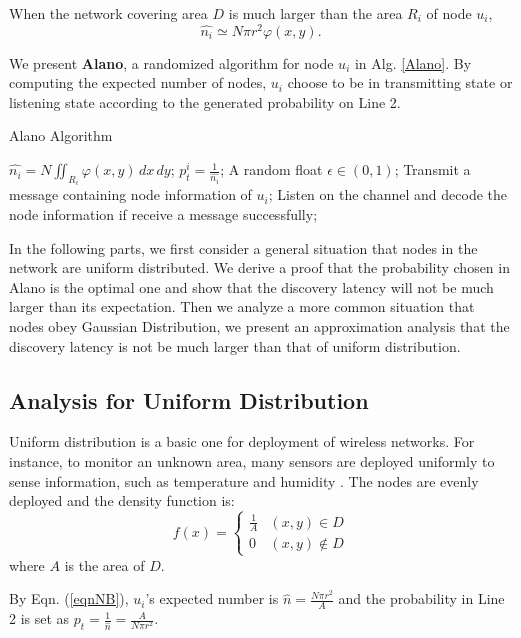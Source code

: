 When the network covering area $D$ is much larger than the area $R_i$ of node $u_i$, 
\begin{equation}
\label{eqnNB}
\hat{n_i} \simeq N\pi r^2 \varphi(x,y).
\end{equation}


We present \textbf{Alano}, a randomized algorithm for node $u_i$ in Alg. \ref{Alano}.
By computing the expected number of nodes, $u_i$ choose to be in transmitting state or listening state according to the generated probability on Line 2.


\begin{algorithm}
\caption{Alano Algorithm}
\label{Alano}
\begin{algorithmic}[1]
\STATE $\hat{n_i} = N\iint_{R_i} \varphi(x,y)\,dx\,dy$;
\STATE $p_t^i = \frac{1}{\hat{n_i}}$;
	\STATE A random float $\epsilon \in (0,1)$;
    		\STATE Transmit a message containing node information of $u_i$;
	\ELSE
    		\STATE Listen on the channel and decode the node information if receive a message successfully;
	\ENDIF
\ENDWHILE
\end{algorithmic}
\end{algorithm}

In the following parts, we first consider a general situation that nodes in the network are uniform distributed. We derive a proof that the probability chosen in Alano is the optimal one and show that the discovery latency will not be much larger than its expectation. Then we analyze a more common situation that nodes obey Gaussian Distribution, we present an
approximation analysis that the discovery latency is not be much larger than that of uniform distribution.


\subsection{Analysis for Uniform Distribution}
\label{uniform}
Uniform distribution is a basic one for deployment of wireless networks.
For instance, to monitor an unknown area, many sensors are deployed uniformly to sense information, such as temperature and humidity \cite{flammini2007real}. The nodes are evenly deployed and the density function is:
$$f(x)=
\begin{cases}
\frac{1}{A}& (x,y)\in D\\
0& (x,y)\notin D
\end{cases}$$
where $A$ is the area of $D$.

By Eqn. (\ref{eqnNB}), $u_i$'s expected number is $\hat{n} = \frac{N\pi r^2}{A}$ and the probability in Line 2 is set as $p_t = \frac{1}{\hat{n}}=\frac{A}{N\pi r^2}$.

